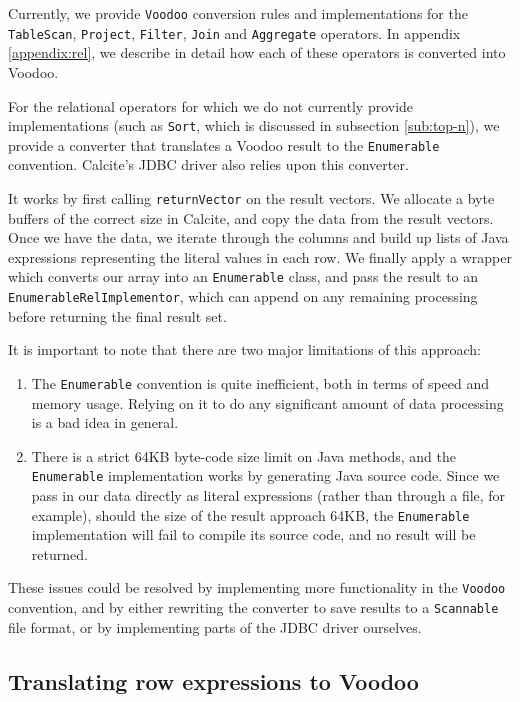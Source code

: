 Currently, we provide \texttt{Voodoo} conversion rules and implementations for the \texttt{TableScan}, \texttt{Project}, \texttt{Filter}, \texttt{Join} and \texttt{Aggregate} operators. In appendix \ref{appendix:rel}, we describe in detail how each of these operators is converted into Voodoo.

For the relational operators for which we do not currently provide implementations (such as \texttt{Sort}, which is discussed in subsection \ref{sub:top-n}), we provide a converter that translates a Voodoo result to the \texttt{Enumerable} convention. Calcite's JDBC driver also relies upon this converter.

It works by first calling \texttt{returnVector} on the result vectors. We allocate a byte buffers of the correct size in Calcite, and copy the data from the result vectors. Once we have the data, we iterate through the columns and build up lists of Java expressions representing the literal values in each row. We finally apply a wrapper which converts our array into an \texttt{Enumerable} class, and pass the result to an \texttt{EnumerableRelImplementor}, which can append on any remaining processing before returning the final result set.

It is important to note that there are two major limitations of this approach:
\begin{enumerate}
    \item The \texttt{Enumerable} convention is quite inefficient, both in terms of speed and memory usage. Relying on it to do any significant amount of data processing is a bad idea in general.
    \item There is a strict 64KB byte-code size limit on Java methods, and the \texttt{Enumerable} implementation works by generating Java source code. Since we pass in our data directly as literal expressions (rather than through a file, for example), should the size of the result approach 64KB, the \texttt{Enumerable} implementation will fail to compile its source code, and no result will be returned.
\end{enumerate}
These issues could be resolved by implementing more functionality in the \texttt{Voodoo} convention, and by either rewriting the converter to save results to a \texttt{Scannable} file format, or by implementing parts of the JDBC driver ourselves.

\subsection{Translating row expressions to Voodoo}
\label{sub:rex}

